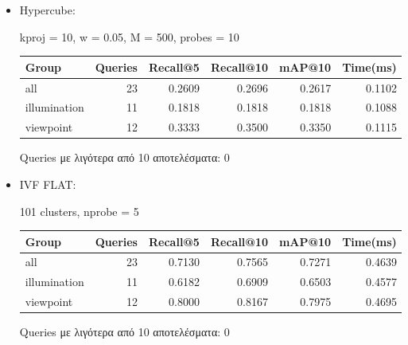 \documentclass [conference]{IEEEtran}
\begin{document}
\begin{itemize}
    \item Hypercube: \newline
    \begin{table}[H]
    \centering
    \small
    \setlength{\tabcolsep}{3pt}
    kproj = 10, w = 0.05, M = 500, probes = 10
    \par\smallskip
    \begin{tabular}{l r r r r r}
    \hline
    \textbf{Group} & \textbf{Queries} & \textbf{Recall@5} & \textbf{Recall@10} & \textbf{mAP@10} & \textbf{Time(ms)} \\
    \hline
    all & 23 & 0.2609 & 0.2696 & 0.2617 & 0.1102 \\
    illumination & 11 & 0.1818 & 0.1818 & 0.1818 & 0.1088 \\
    viewpoint & 12 & 0.3333 & 0.3500 & 0.3350 & 0.1115 \\
    \hline
    \end{tabular}
    \par\smallskip
    \footnotesize Queries με λιγότερα από 10 αποτελέσματα: 0
    \end{table}


    \item IVF FLAT:
    \begin{table}[H]
    \centering
    \small
    \setlength{\tabcolsep}{3pt}
    101 clusters, nprobe = 5
    \par\smallskip
    \begin{tabular}{l r r r r r}
    \hline
    \textbf{Group} & \textbf{Queries} & \textbf{Recall@5} & \textbf{Recall@10} & \textbf{mAP@10} & \textbf{Time(ms)} \\
    \hline
    all & 23 & 0.7130 & 0.7565 & 0.7271 & 0.4639 \\
    illumination & 11 & 0.6182 & 0.6909 & 0.6503 & 0.4577 \\
    viewpoint & 12 & 0.8000 & 0.8167 & 0.7975 & 0.4695 \\
    \hline
    \end{tabular}
    \par\smallskip
    \footnotesize Queries με λιγότερα από 10 αποτελέσματα: 0
    \end{table}



\end{itemize}
\end{document}
